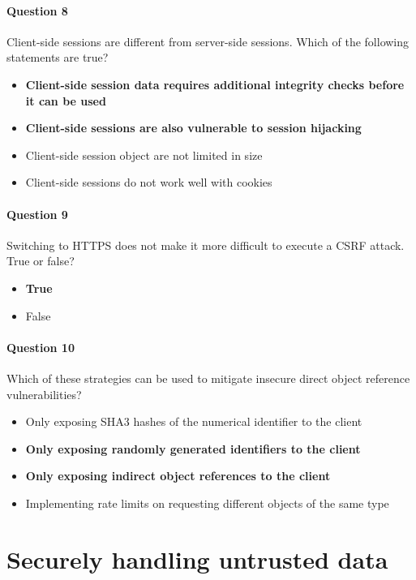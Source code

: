 \documentclass[titlepage]{article}
\begin{document}
    \paragraph{Question 8} Client-side sessions are different from server-side sessions. Which of the following statements are true?
    \begin{itemize}
        \item \textbf{Client-side session data requires additional integrity checks before it can be used} \checkmark
        \item \textbf{Client-side sessions are also vulnerable to session hijacking} \checkmark
        \item Client-side session object are not limited in size
        \item Client-side sessions do not work well with cookies
    \end{itemize}
    \paragraph{Question 9} Switching to HTTPS does not make it more difficult to execute a CSRF attack. True or false?
    \begin{itemize}
        \item \textbf{True} \checkmark
        \item False
    \end{itemize}
    \paragraph{Question 10} Which of these strategies can be used to mitigate insecure direct object reference vulnerabilities?
    \begin{itemize}
        \item Only exposing SHA3 hashes of the numerical identifier to the client
        \item \textbf{Only exposing randomly generated identifiers to the client} \checkmark
        \item \textbf{Only exposing indirect object references to the client} \checkmark
        \item Implementing rate limits on requesting different objects of the same type
    \end{itemize}


    \newpage
    \section{Securely handling untrusted data}
\end{document}

